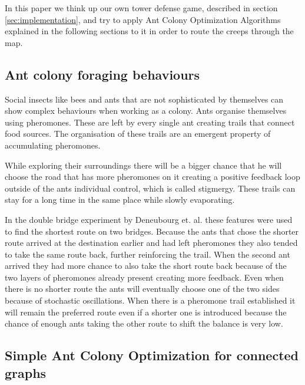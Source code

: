 In this paper we think up our own tower defense game, described in section \ref{sec:implementation}, and try to apply Ant Colony Optimization Algorithms explained in the following sections to it in order to route the creeps through the map.

\subsection{Ant colony foraging behaviours}


Social insects like bees and ants that are not sophisticated by themselves can show complex behaviours when working as a colony. Ants organise themselves using pheromones. These are left by every single ant creating trails that connect food sources. The organisation of these trails are an emergent property of accumulating pheromones\cite{blum2005ant}.

While exploring their surroundings there will be a bigger chance that he will choose the road that has more pheromones on it creating a positive feedback loop outside of the ants individual control, which is called stigmergy. These trails can stay for a long time in the same place while slowly evaporating\cite{cordon2002review}.

In the double bridge experiment by Deneubourg et. al. these features were used to find the shortest route on two bridges. Because the ants that chose the shorter route arrived at the destination earlier and had left pheromones they also tended to take the same route back, further reinforcing the trail. When the second ant arrived they had more chance to also take the short route back because of the two layers of pheromones already present creating more feedback\cite{deneubourg1990self}. Even when there is no shorter route the ants will eventually choose one of the two sides because of stochastic oscillations. When there is a pheromone trail established it will remain the preferred route even if a shorter one is introduced because the chance of enough ants taking the other route to shift the balance is very low\cite{dorigo2006introduction}.

\subsection{Simple Ant Colony Optimization for connected graphs}

